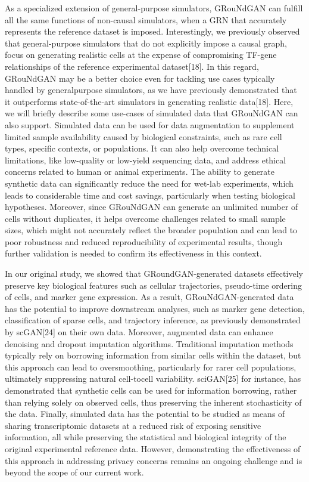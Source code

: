 As a specialized extension of general-purpose simulators, GRouNdGAN can fulfill all the same
functions of non-causal simulators, when a GRN that accurately represents the reference dataset
is imposed. Interestingly, we previously observed that general-purpose simulators that do not
explicitly impose a causal graph, focus on generating realistic cells at the expense of compromising TF-gene relationships of the reference experimental dataset[18]. In this regard,
GRouNdGAN may be a better choice even for tackling use cases typically handled by generalpurpose simulators, as we have previously demonstrated that it outperforms state-of-the-art
simulators in generating realistic data[18]. Here, we will briefly describe some use-cases of
simulated data that GRouNdGAN can also support. Simulated data can be used for data
augmentation to supplement limited sample availability caused by biological constraints, such as
rare cell types, specific contexts, or populations. It can also help overcome technical limitations,
like low-quality or low-yield sequencing data, and address ethical concerns related to human or
animal experiments. The ability to generate synthetic data can significantly reduce the need for
wet-lab experiments, which leads to considerable time and cost savings, particularly when testing
biological hypotheses. Moreover, since GRouNdGAN can generate an unlimited number of cells
without duplicates, it helps overcome challenges related to small sample sizes, which might not
accurately reflect the broader population and can lead to poor robustness and reduced
reproducibility of experimental results, though further validation is needed to confirm its
effectiveness in this context.

In our original study, we showed that GRoundGAN-generated datasets effectively preserve key
biological features such as cellular trajectories, pseudo-time ordering of cells, and marker gene
expression. As a result, GRouNdGAN-generated data has the potential to improve downstream
analyses, such as marker gene detection, classification of sparse cells, and trajectory inference,
as previously demonstrated by scGAN[24] on their own data. Moreover, augmented data can
enhance denoising and dropout imputation algorithms. Traditional imputation methods typically rely on borrowing information from similar cells within the dataset, but this approach can lead
to oversmoothing, particularly for rarer cell populations, ultimately suppressing natural cell-tocell variability. sciGAN[25] for instance, has demonstrated that synthetic cells can be used for
information borrowing, rather than relying solely on observed cells, thus preserving the inherent
stochasticity of the data. Finally, simulated data has the potential to be studied as means of
sharing transcriptomic datasets at a reduced risk of exposing sensitive information, all while
preserving the statistical and biological integrity of the original experimental reference data.
However, demonstrating the effectiveness of this approach in addressing privacy concerns
remains an ongoing challenge and is beyond the scope of our current work.

